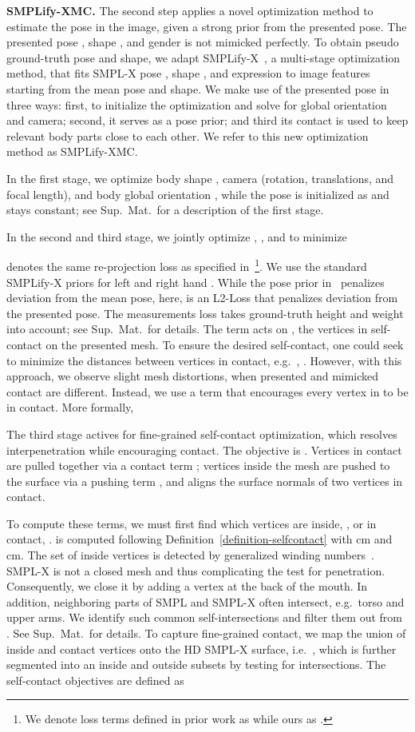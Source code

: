 \documentclass[final]{cvpr}
\renewcommand{\ie}{i.e.\xspace}
\newcommand{\suppmat}{Sup.~Mat.\xspace}
\newcommand{\smplifyxmc}{\mbox{SMPLify-XMC}\xspace}
\theoremstyle{definition}
\begin{document}
\textbf{\smplifyxmc.}
The second step applies a novel optimization method to estimate the pose in the image, given a strong prior from the presented pose.
The presented pose , shape , and gender is not mimicked perfectly.
To obtain pseudo ground-truth pose and shape, we adapt SMPLify-X~\cite{SMPL-X:2019}, a multi-stage optimization method, that fits  SMPL-X pose , shape , and expression  to image features starting from the mean pose and shape. We make use of the presented pose  in three ways: first, to initialize the optimization and solve for global orientation and camera; second, it serves as a pose prior; and third its contact is used to keep relevant body parts close to each other. We refer to this new optimization method as \smplifyxmc.

In the first stage, we optimize body shape , camera  (rotation, translations, and focal length), and body global orientation , while the pose  is initialized as  and stays constant; see \suppmat~for a description of the first stage.

In the second and third stage, we jointly optimize , , and   to minimize 

 denotes the same re-projection loss as specified in~\cite{SMPL-X:2019}\footnote{We denote loss terms defined in prior work as  while ours as .}. We use the standard SMPLify-X  priors for left and right hand . While the pose prior in~\cite{SMPL-X:2019} penalizes deviation from the mean pose, here,  is an L2-Loss that penalizes deviation from the presented pose. The measurements loss  takes ground-truth height and weight into account; see \suppmat~for details. The term  acts on , 
the vertices in self-contact on the presented mesh.
To ensure the desired self-contact, one could seek to minimize the distances between vertices in contact, e.g.~, . However, with this approach, we observe slight mesh distortions, when presented and mimicked contact are different.
Instead, we use a term that encourages every vertex in  to be in contact. More formally, 


The third stage actives   for fine-grained self-contact optimization, which resolves interpenetration while encouraging contact. 
The objective is .
Vertices in contact are pulled together via a contact term ; vertices inside the mesh are pushed to the surface via a pushing term , and  aligns the surface normals of two vertices in contact.

To compute these terms, we must first find which vertices are inside, , or in contact, . 
 is computed following Definition~\ref{definition-selfcontact} with cm and cm.
The set of inside vertices  is detected by generalized winding numbers~\cite{jacobson2013robust}. 
SMPL-X is not a closed mesh and thus complicating the test for penetration.
Consequently, we close it by adding a vertex at the back of the mouth.
In addition, neighboring parts of SMPL and SMPL-X often intersect, e.g.~torso and upper arms.
We identify such common self-intersections and filter them out from . See Sup.~Mat.~for details.
To capture fine-grained contact, we map the union of inside and contact vertices onto the HD SMPL-X surface, \ie~, 
which is further segmented into an inside  and outside  subsets by testing for intersections. 
The self-contact objectives are defined as 
\end{document}

